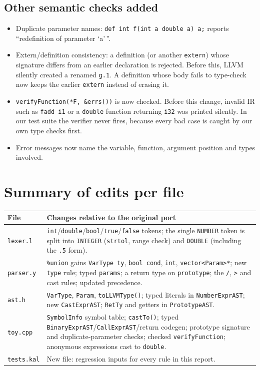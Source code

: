 \documentclass[10pt,a4paper]{article}
\newcommand{\code}[1]{\texttt{#1}}
\begin{document}
\subsection{Other semantic checks added}
\begin{itemize}
\item Duplicate parameter names: \code{def int f(int a double a) a;} reports
  ``redefinition of parameter `a'\,''.
\item Extern/definition consistency: a definition (or another \code{extern})
  whose signature differs from an earlier declaration is rejected. Before this,
  LLVM silently created a renamed \code{g.1}. A definition whose body fails to
  type-check now keeps the earlier \code{extern} instead of erasing it.
\item \code{verifyFunction(*F, \&errs())} is now checked. Before this change,
  invalid IR such as \code{fadd i1} or a \code{double} function returning
  \code{i32} was printed silently. In our test suite the verifier never fires,
  because every bad case is caught by our own type checks first.
\item Error messages now name the variable, function, argument position and
  types involved.
\end{itemize}

\section{Summary of edits per file}
\begin{center}\small
\begin{tabular}{@{}lp{}@{}}
\toprule
File & Changes relative to the original port \\
\midrule
\code{lexer.l} & \code{int}/\code{double}/\code{bool}/\code{true}/\code{false} tokens; the single
  \code{NUMBER} token is split into \code{INTEGER} (\code{strtol}, range check) and
  \code{DOUBLE} (including the \code{.5} form). \\
\code{parser.y} & \code{\%union} gains \code{VarType ty}, \code{bool cond}, \code{int},
  \code{vector<Param>*}; new \code{type} rule; typed \code{params}; a return type
  on \code{prototype}; the \code{/}, \code{>} and cast rules; updated precedence. \\
\code{ast.h} & \code{VarType}, \code{Param}, \code{toLLVMType()}; typed literals in
  \code{NumberExprAST}; new \code{CastExprAST}; \code{RetTy} and getters in
  \code{PrototypeAST}. \\
\code{toy.cpp} & \code{SymbolInfo} symbol table; \code{castTo()}; typed
  \code{BinaryExprAST}/\code{CallExprAST}/return codegen; prototype signature and
  duplicate-parameter checks; checked \code{verifyFunction}; anonymous expressions
  cast to \code{double}. \\
\code{tests.kal} & New file: regression inputs for every rule in this report. \\
\bottomrule
\end{tabular}
\end{center}
\end{document}
